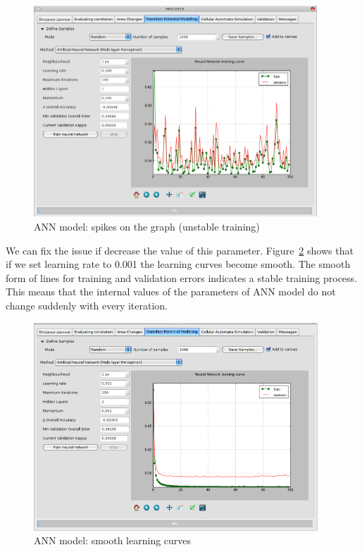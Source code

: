 \documentclass{report}
\begin{document}
\begin{figure}[h!]
\centering
\includegraphics[width=0.95\textwidth]{img/ann_spikes.png}
\caption{ANN model: spikes on the graph (unstable training)}
\label{fig:ann_spikes}
\end{figure}

We can fix the issue if decrease the value of this parameter. Figure~\ref{fig:ann_spikes_fxd} shows 
that if we set learning rate to 0.001 the learning curves become smooth. The smooth form of 
lines for training and validation errors indicates a stable training process. This means that the
internal values of the parameters of ANN model do not change suddenly with every iteration. 


\begin{figure}[h!]
\centering
\includegraphics[width=0.95\textwidth]{img/ann_spikes_fxd.png}
\caption{ANN model: smooth learning curves}
\label{fig:ann_spikes_fxd}
\end{figure}
\end{document}
